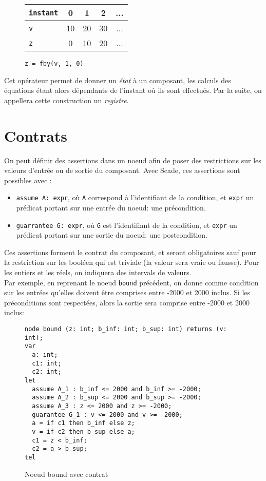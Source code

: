 \begin{figure}[h]
\begin{center}
\begin{tabular}{ l || c | c | c | c }
\texttt{instant} & 0 & 1 & 2 & ... \\ \hline
\texttt{v} & 10 & 20 & 30 & ... \\
\texttt{z} & 0 & 10 & 20 & ... \\
\end{tabular}
\end{center}
\caption{\texttt{z = fby(v, 1, 0)}}
\end{figure}

Cet opérateur permet de donner un \emph{état} à un composant, les
calculs des équations étant alors dépendants de l'instant où ils sont
effectués.
Par la suite, on appellera cette construction un \emph{registre}.


\section{Contrats}

On peut définir des assertions dans un noeud afin de poser des
restrictions sur les valeurs d'entrée ou de sortie du composant. Avec
Scade, ces assertions sont possibles avec :
\begin{itemize}
\item \texttt{assume A: expr}, où \texttt{A} correspond à l'identifiant de la condition, et
\texttt{expr} un prédicat portant sur une entrée du noeud: une précondition.
\item \texttt{guarrantee G: expr}, où \texttt{G} est l'identifiant de la condition, et
\texttt{expr} un prédicat portant sur une sortie du noeud: une postcondition.
\end{itemize}
Ces assertions forment le contrat du composant, et seront
obligatoires sauf pour la restriction sur les booléen qui est triviale (la
valeur sera vraie ou fausse). Pour les entiers et les réels, on
indiquera des intervals de valeurs.\\

Par exemple, en reprenant le noeud \texttt{bound} précédent, on donne comme condition sur
les entrées qu'elles doivent être comprises entre -2000 et 2000 inclus. Si les
préconditions sont respectées, alors la sortie sera comprise entre -2000
et 2000 inclus:
\begin{figure}[h]
\begin{center}
\begin{verbatim}
node bound (z: int; b_inf: int; b_sup: int) returns (v: int);
var
  a: int;
  c1: int;
  c2: int;
let
  assume A_1 : b_inf <= 2000 and b_inf >= -2000;
  assume A_2 : b_sup <= 2000 and b_sup >= -2000;
  assume A_3 : z <= 2000 and z >= -2000;
  guarantee G_1 : v <= 2000 and v >= -2000;
  a = if c1 then b_inf else z;
  v = if c2 then b_sup else a;
  c1 = z < b_inf;
  c2 = a > b_sup;
tel
\end{verbatim}
\end{center}
\caption{Noeud bound avec contrat}
\end{figure}

